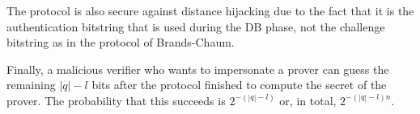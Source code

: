 The protocol is also secure against distance hijacking due to the fact
that it is the authentication bitstring that is used during the \ac{DB}
phase, not the challenge bitstring as in the protocol of Brands-Chaum.

Finally, a malicious verifier who wants to impersonate a prover can guess the 
remaining \(|q|-l\) bits after the protocol finished to compute the secret of 
the prover.
The probability that this succeeds is \(2^{-(|q|-l)}\) or, in total, 
\(2^{-(|q|-l)n}\).
